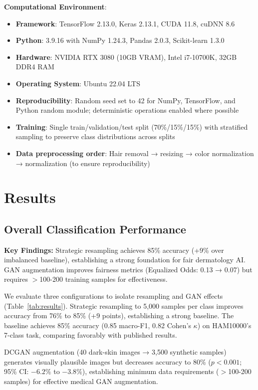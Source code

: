 \documentclass[10pt, twocolumn, letterpaper]{article}
\begin{document}
\textbf{Computational Environment}:
\begin{itemize}[leftmargin=*, itemsep=2pt]
    \item \textbf{Framework}: TensorFlow 2.13.0, Keras 2.13.1, CUDA 11.8, cuDNN 8.6
    \item \textbf{Python}: 3.9.16 with NumPy 1.24.3, Pandas 2.0.3, Scikit-learn 1.3.0
    \item \textbf{Hardware}: NVIDIA RTX 3080 (10GB VRAM), Intel i7-10700K, 32GB DDR4 RAM
    \item \textbf{Operating System}: Ubuntu 22.04 LTS
    \item \textbf{Reproducibility}: Random seed set to 42 for NumPy, TensorFlow, and Python random module; deterministic operations enabled where possible
    \item \textbf{Training}: Single train/validation/test split (70\%/15\%/15\%) with stratified sampling to preserve class distributions across splits
    \item \textbf{Data preprocessing order}: Hair removal → resizing → color normalization → normalization (to ensure reproducibility)
\end{itemize}

\section{Results}
\label{sec:results}

\subsection{Overall Classification Performance}

\textbf{Key Findings:} Strategic resampling achieves 85\% accuracy (+9\% over imbalanced baseline), establishing a strong foundation for fair dermatology AI. GAN augmentation improves fairness metrics (Equalized Odds: 0.13 → 0.07) but requires $>$100-200 training samples for effectiveness.

We evaluate three configurations to isolate resampling and GAN effects (Table~\ref{tab:results}). Strategic resampling to 5,000 samples per class improves accuracy from 76\% to 85\% (+9 points), establishing a strong baseline. The baseline achieves 85\% accuracy (0.85 macro-F1, 0.82 Cohen's $\kappa$) on HAM10000's 7-class task, comparing favorably with published results.

DCGAN augmentation (40 dark-skin images → 3,500 synthetic samples) generates visually plausible images but decreases accuracy to 80\% ($p < 0.001$; 95\% CI: $-6.2\%$ to $-3.8\%$), establishing minimum data requirements ($>$100-200 samples) for effective medical GAN augmentation.
\end{document}
